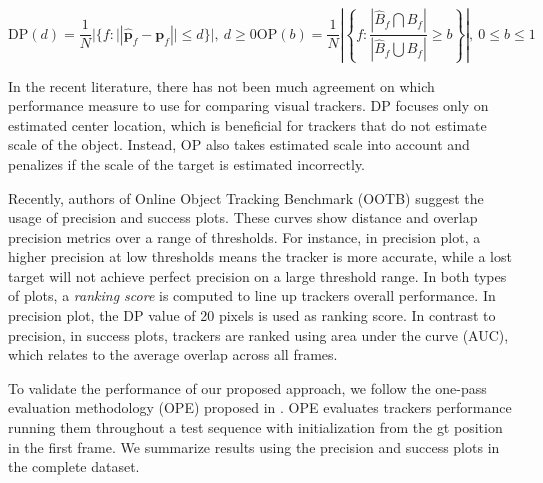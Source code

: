 \begin{subequations}
\begin{equation}
	\mathrm{DP}(d) = \frac{1}{N}|\{f:||\mathbf{\hat{p}}_f - \mathbf{p}_f|| \leq d\}|,\:d\geq 0
\label{eq::precision}
\end{equation}

\begin{equation}
	\mathrm{OP}(b) = \frac{1}{N}\left | \left \{ f: \frac{|\hat{B}_f \bigcap B_f|}
										{|\hat{B}_f \bigcup  B_f|}
	 \geq b \right \} \right |,\:0 \leq b\leq 1
\label{eq::overlap}
\end{equation}
\end{subequations}

In the recent literature, there has not been much agreement on which
performance measure to use for comparing visual trackers. DP focuses only
on estimated center location, which is beneficial for trackers that do not
estimate scale of the object. Instead, OP also takes estimated scale into
account and penalizes if the scale of the target is estimated incorrectly.

Recently, authors of Online Object Tracking Benchmark (OOTB) \cite{Wu2013B} suggest the usage
of precision and success plots. These curves show distance and \gls{overlap} precision metrics over a range of
thresholds. For instance, in precision plot, a higher precision at low
thresholds means the tracker is more accurate, while a lost target will not
achieve perfect precision on a large threshold range. In both types of plots,
a \textit{ranking score} is computed to line up trackers overall performance.
In precision plot, the DP value of 20 pixels is used as ranking score. In contrast to precision, in success plots, trackers are ranked using area under
the curve (AUC), which relates to the average overlap across all frames. 

To validate the performance of our proposed approach, we follow the one-pass
evaluation methodology (OPE) proposed in \cite{Wu2013B}. OPE evaluates trackers
performance running them throughout a test sequence with initialization from
the \gls{gt} position in the first frame. We summarize results using the precision and
success plots in the complete dataset.

